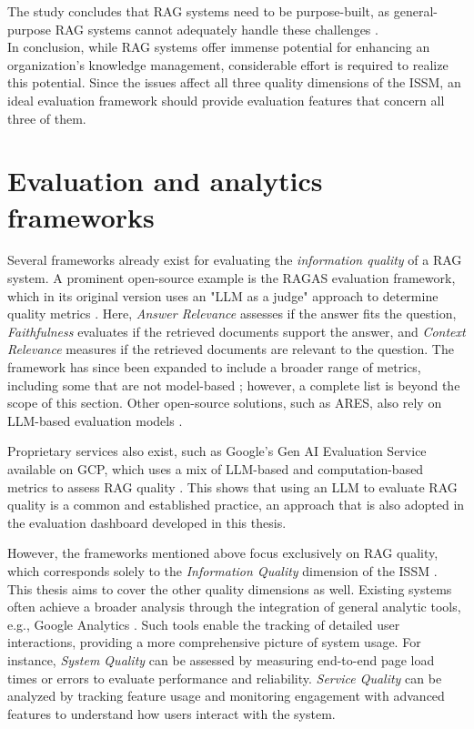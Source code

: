 \documentclass[
	english,
	ruledheaders=section,%
	class=report,%
	thesis={type=bachelor},%
	accentcolor=1b,%
	custommargins=true,%
	marginpar=false,%
	parskip=half-,%
	fontsize=11pt,%
	DIV=14,
]{tudapub}
\begin{document}
The study concludes that RAG systems need to be purpose-built, as general-purpose RAG systems cannot adequately handle these challenges \parencite[pp.~6--7]{Bruckhaus2024RAG}.\\
In conclusion, while RAG systems offer immense potential for enhancing an organization's knowledge management, considerable effort is required to realize this potential. Since the issues affect all three quality dimensions of the ISSM, an ideal evaluation framework should provide evaluation features that concern all three of them.
\section{Evaluation and analytics frameworks}
Several frameworks already exist for evaluating the \textit{information quality} of a RAG system. A prominent open-source example is the RAGAS evaluation framework, which in its original version uses an "LLM as a judge" approach to determine quality metrics \parencite[pp.~123--124]{Es2024}. Here, \textit{Answer Relevance} assesses if the answer fits the question, \textit{Faithfulness} evaluates if the retrieved documents support the answer, and \textit{Context Relevance} measures if the retrieved documents are relevant to the question. The framework has since been expanded to include a broader range of metrics, including some that are not model-based \parencite{RagasMetrics}; however, a complete list is beyond the scope of this section. Other open-source solutions, such as ARES, also rely on LLM-based evaluation models \parencite[p.~216]{Saad-Falcon2024}.

Proprietary services also exist, such as Google's Gen AI Evaluation Service available on GCP, which uses a mix of LLM-based and computation-based metrics to assess RAG quality \parencite{GoogleGenAIEvaluation}. This shows that using an LLM to evaluate RAG quality is a common and established practice, an approach that is also adopted in the evaluation dashboard developed in this thesis.

However, the frameworks mentioned above focus exclusively on RAG quality, which corresponds solely to the \textit{Information Quality} dimension of the ISSM \parencite{DeloneMcLean2003ISSuccessTenYearUpdate}. This thesis aims to cover the other quality dimensions as well. Existing systems often achieve a broader analysis through the integration of general analytic tools, e.g., Google Analytics \parencite{GoogleAnalytics}. Such tools enable the tracking of detailed user interactions, providing a more comprehensive picture of system usage. For instance, \textit{System Quality} \parencite[p.~64]{DeloneMcLean1992ISSuccess} can be assessed by measuring end-to-end page load times or errors to evaluate performance and reliability. \textit{Service Quality} \parencite[p.~18]{DeloneMcLean2003ISSuccessTenYearUpdate} can be analyzed by tracking feature usage and monitoring engagement with advanced features to understand how users interact with the system.
\end{document}
